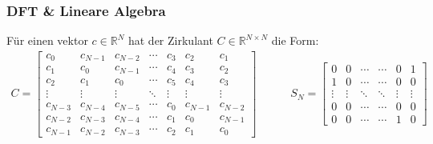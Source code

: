 \newpage
\subsubsection{DFT \& Lineare Algebra}

 Für einen vektor $c \in \mathbb{R}^N$ hat der Zirkulant $C \in \mathbb{R}^{N \times N}$ die Form:
\begin{align*}
    C = \begin{bmatrix}
        c_0 & c_{N-1} & c_{N-2} & \cdots & c_3 & c_2 & c_1 \\
        c_1 & c_0     & c_{N-1} & \cdots & c_4 & c_3 & c_2 \\
        c_2 & c_1     & c_{0}   & \cdots & c_5 & c_4 & c_3 \\
        \vdots & \vdots & \vdots & \ddots & \vdots & \vdots & \vdots \\
        c_{N-3} & c_{N-4} & c_{N-5} & \cdots & c_0 & c_{N-1} & c_{N-2} \\
        c_{N-2} & c_{N-3} & c_{N-4} & \cdots & c_{1} & c_0 & c_{N-1} \\
        c_{N-1} & c_{N-2} & c_{N-3} & \cdots & c_{2} & c_1 & c_0
    \end{bmatrix}
    \quad \quad \quad 
    S_N = \begin{bmatrix}
        0 & 0 & \cdots & \cdots & 0 & 1 \\
        1 & 0 & \cdots & \cdots & 0 & 0 \\
        \vdots & \vdots & \ddots & \ddots & \vdots & \vdots \\
        0 & 0 & \cdots & \cdots & 0 & 0 \\
        0 & 0 & \cdots & \cdots & 1 & 0 
    \end{bmatrix}
\end{align*}

